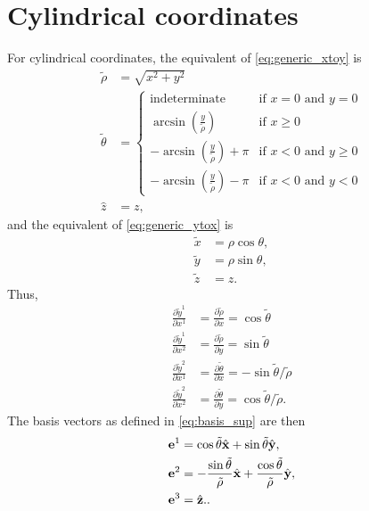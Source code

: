 \documentclass[11pt]{article}
\newcommand{\xtilde}{\tilde{x}}
\newcommand{\ytilde}{\tilde{y}}
\newcommand{\ztilde}{\tilde{z}}
\newcommand{\rhotilde}{\tilde{\rho}}
\newcommand{\thetatilde}{\tilde{\theta}}
\begin{document}
\section{Cylindrical coordinates}
For cylindrical coordinates, the equivalent of \cref{eq:generic_xtoy} is
\begin{align}
    \rhotilde &= \sqrt{x^2 + y^2} \\
    \thetatilde &= {\begin{cases}{\text{indeterminate}}&{\text{if }}x=0{\text{ and }}y=0\\\arcsin \left({\frac {y}{\rhotilde }}\right)&{\text{if }}x\geq 0\\-\arcsin \left({\frac {y}{\rhotilde }}\right)+\pi &{\mbox{if }}x<0{\text{ and }}y\geq 0\\-\arcsin \left({\frac {y}{\rhotilde }}\right)-\pi &{\mbox{if }}x<0{\text{ and }}y<0\end{cases}} \\
    \hat{z} & = z,
\end{align}
and the equivalent of \cref{eq:generic_ytox} is 
\begin{align}
    \xtilde &= \rho \cos \theta, \\
    \ytilde &= \rho \sin \theta, \\
    \ztilde &= z.
\end{align}
Thus, 
\begin{align}
    \frac{\partial \ytilde^1}{\partial x^1} &= \frac{\partial \rhotilde}{\partial x} = \cos \thetatilde \\
    \frac{\partial \ytilde^1}{\partial x^2} &= \frac{\partial \rhotilde}{\partial y} = \sin \thetatilde \\
    \frac{\partial \ytilde^2}{\partial x^1} &= \frac{\partial \thetatilde}{\partial x} = -\sin \thetatilde / \rhotilde \\
    \frac{\partial \ytilde^2}{\partial x^2} &= \frac{\partial \thetatilde}{\partial y} = \cos \thetatilde / \rhotilde.
\end{align}
The basis vectors as defined in \cref{eq:basis_sup} are then 
\begin{align}
    \evec^{1} &= \cos \thetatilde \hat{\xvec} + \sin \thetatilde \hat{\yvec}, \label{eq:cyl_e1}\\
    \evec^{2} &= -\frac{\sin \thetatilde}{\rhotilde} \hat{\xvec} + \frac{\cos \thetatilde}{\rhotilde} \hat{\yvec}, \label{eq:cyl_e2} \\
    \evec^{3} &= \hat{\zvec}. \label{eq:cyl_3}.
\end{align}
\end{document}
